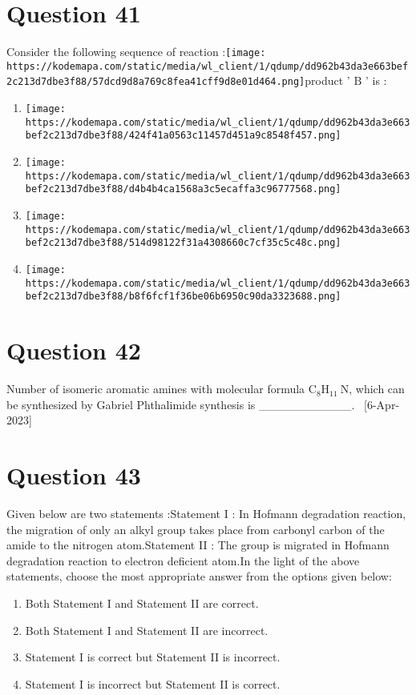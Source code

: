 \documentclass{article}
\begin{document}
\section*{Question 41}
Consider the following sequence of reaction :\texttt{[image: https://kodemapa.com/static/media/wl\_client/1/qdump/dd962b43da3e663bef2c213d7dbe3f88/57dcd9d8a769c8fea41cff9d8e01d464.png]}\newlineThe product ' \(\mathrm{B}\) ' is : 
\begin{enumerate}[label=(\alph*)]
\item \texttt{[image: https://kodemapa.com/static/media/wl\_client/1/qdump/dd962b43da3e663bef2c213d7dbe3f88/424f41a0563c11457d451a9c8548f457.png]}
\item \texttt{[image: https://kodemapa.com/static/media/wl\_client/1/qdump/dd962b43da3e663bef2c213d7dbe3f88/d4b4b4ca1568a3c5ecaffa3c96777568.png]}
\item \texttt{[image: https://kodemapa.com/static/media/wl\_client/1/qdump/dd962b43da3e663bef2c213d7dbe3f88/514d98122f31a4308660c7cf35c5c48c.png]}
\item \texttt{[image: https://kodemapa.com/static/media/wl\_client/1/qdump/dd962b43da3e663bef2c213d7dbe3f88/b8f6fcf1f36be06b6950c90da3323688.png]}
\end{enumerate}
\newpage
\section*{Question 42}
Number of isomeric aromatic amines with molecular formula \(\mathrm{C}_8 \mathrm{H}_{11} \mathrm{~N}\), which can be synthesized by Gabriel Phthalimide synthesis is ___________.  [6-Apr-2023]
\begin{enumerate}[label=(\alph*)]
\end{enumerate}
\newpage
\section*{Question 43}
Given below are two statements :Statement I : In Hofmann degradation reaction, the migration of only an alkyl group takes place from carbonyl carbon of the amide to the nitrogen atom.Statement II : The group is migrated in Hofmann degradation reaction to electron deficient atom.In the light of the above statements, choose the most appropriate answer from the options given below: 
\begin{enumerate}[label=(\alph*)]
\item Both Statement I and Statement II are correct.
\item Both Statement I and Statement II are incorrect.
\item Statement I is correct but Statement II is incorrect.
\item Statement I is incorrect but Statement II is correct.
\end{enumerate}
\newpage
\end{document}
